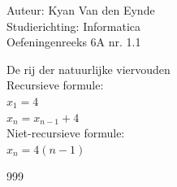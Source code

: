 \documentclass[a4paper]{article}
\begin{document}
  
\noindent \large Auteur: Kyan Van den Eynde \\
\noindent \large Studierichting: Informatica\\
\noindent \large Oefeningenreeks 6A nr. 1.1\\

\medskip

\normalsize

De rij der natuurlijke viervouden\\

Recursieve formule:\\

$x_1 = 4$\\

$x_n = x_{n-1}+4$\\

Niet-recursieve formule:\\

$x_n = 4(n-1)$\\

\begin{thebibliography}{999}
\end{thebibliography}
\end{document}

